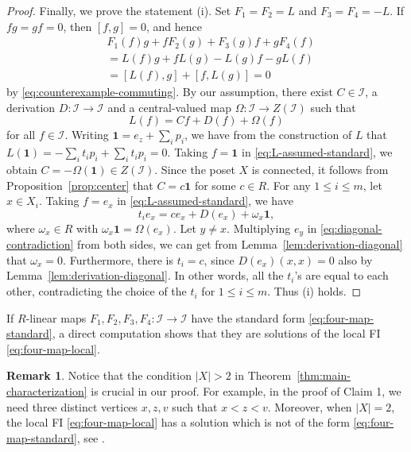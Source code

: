 \documentclass[reqno]{amsart}
\numberwithin{equation}{section}
\theoremstyle{plain}
\theoremstyle{definition}
\newtheorem{remark}[theorem]{Remark}
\newcommand{\I}{\mathcal I}
\newcommand{\one}{\mathbf 1}
\begin{document}
\begin{proof}
Finally, we prove the statement (i).
Set $F_1=F_2=L$ and $F_3=F_4=-L$.
If $fg=gf=0$, then $[f,g]=0$, and hence
\[
\begin{aligned}
&F_1(f)g+fF_2(g)+F_3(g)f+gF_4(f)\\
&=L(f)g+fL(g)-L(g)f-gL(f)\\
&=[L(f),g]+[f,L(g)]=0
\end{aligned}
\]
by \eqref{eq:counterexample-commuting}. By our assumption, there exist $C\in\I$,
a derivation $D:\I\to \I$ and a central-valued map $\Omega: \I\to Z(\I)$ such that
\begin{equation}\label{eq:L-assumed-standard}
L(f)=Cf+D(f)+\Omega(f)
\end{equation}
for all $f\in\I$. Writing $\one=e_z+\sum_i p_i$, we have from the construction of $L$ that
$L(\one)=-\sum_i t_ip_i+\sum_i t_ip_i=0$. Taking $f=\one$ in \eqref{eq:L-assumed-standard},
we obtain $C=-\Omega(\one)\in Z(\I)$. Since the poset $X$ is connected, it follows from
Proposition~\ref{prop:center} that $C=c\one$ for some $c\in R$.
For any $1\leq i\leq m$, let $x\in X_i$. Taking $f=e_x$ in \eqref{eq:L-assumed-standard}, we have
\begin{equation}\label{eq:diagonal-contradiction}
t_i e_x=ce_x+D(e_x)+\omega_x\one,
\end{equation}
where $\omega_x\in R$ with $\omega_x\one=\Omega(e_x)$. Let $y\neq x$.
Multiplying $e_y$ in \eqref{eq:diagonal-contradiction} from both sides, we can get from Lemma~\ref{lem:derivation-diagonal}
that $\omega_x=0$. Furthermore, there is $t_i=c$, since $D(e_x)(x,x)=0$ also by Lemma~\ref{lem:derivation-diagonal}.
In other words, all the $t_i$'s are equal to each other, contradicting the
choice of the $t_i$ for $1\leq i\leq m$. Thus (i) holds.
\end{proof}

If $R$-linear maps $F_1,F_2,F_3,F_4:\I\to\I$ have the standard form \eqref{eq:four-map-standard},
a direct computation shows that they are solutions of the local FI \eqref{eq:four-map-local}.

\begin{remark}\label{rem:counterexample}
Notice that the condition $|X|>2$ in Theorem~\ref{thm:main-characterization} is crucial in our proof.
For example, in the proof of Claim 1, we need three distinct vertices $x,z,v$ such that $x<z<v$.
Moreover, when $|X|=2$, the local FI \eqref{eq:four-map-local} has a solution which is not of the form \eqref{eq:four-map-standard},
see \cite[Example 4.3]{ArgacGhahramani25}.
\end{remark}
\end{document}
